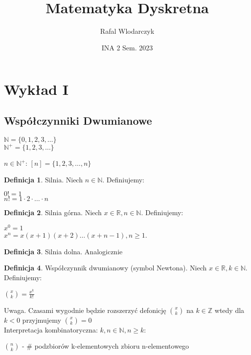 \documentclass{article}
\author{Rafal Wlodarczyk}
\title{Matematyka Dyskretna}
\date{INA 2 Sem. 2023}
\theoremstyle{definition}
\newtheorem{de}{Definicja}[subsection]
\theoremstyle{definition}
\theoremstyle{definition}
\theoremstyle{definition}
\begin{document}
\maketitle

\section{Wykład I}

\subsection{Współczynniki Dwumianowe}

\begin{center}
  $\mathbb{N}=\{0,1,2,3,\dots\}$\\
  $\mathbb{N}^{+}=\{1,2,3,\dots\}$
\end{center}

$n\in\mathbb{N}^{+}$: $[n]=\{1,2,3,\dots,n\}$

\begin{de}
  Silnia. Niech $n\in\mathbb{N}$. Definiujemy:
  \begin{center}
    $0!=1$\\
    $n!=1\cdot2\cdot \dots \cdot n$
  \end{center}
\end{de}

\begin{de}
  Silnia górna. Niech $x\in \mathbb{R}, n\in \mathbb{N}$. Definiujemy:
  \begin{center}
    $x^0 = 1$\\
    $x^n = x(x+1)(x+2)\dots (x+n-1), n\geq 1$.
  \end{center}
\end{de}

\begin{de}
  Silnia dolna. Analogicznie
\end{de}

\begin{de}
  Współczynnik dwumianowy (symbol Newtona). Niech $x\in\mathbb{R}, k\in\mathbb{N}$. Definiujemy:
  \begin{center}
    $\binom{x}{k} = \frac{x^{\underline{k}}}{k!}$
  \end{center}
\end{de}
Uwaga. Czasami wygodnie będzie rozszerzyć defonicję $\binom{x}{k}$ na $k\in\mathbb{Z}$ wtedy dla $k<0$ przyjmujemy $\binom{x}{k}=0$\\
Interpretacja kombinatoryczna: $k, n\in\mathbb{N}, n\geq k$:\\
\begin{center}
  $\binom{n}{k}$ - \# podzbiorów k-elementowych zbioru n-elementowego
\end{center}
\end{document}
